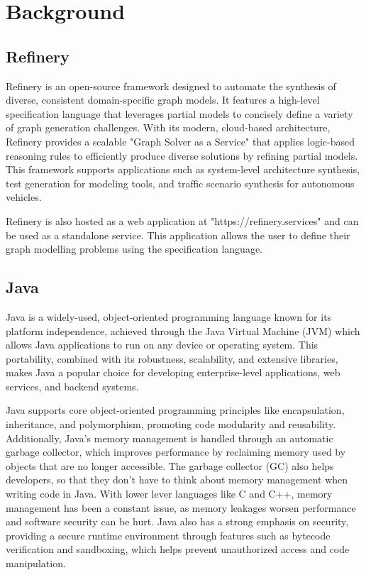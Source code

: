 \chapter{Background}
\section{Refinery}
	Refinery \cite{refinery} is an open-source framework designed to automate the synthesis of diverse, consistent domain-specific graph models. 
	It features a high-level specification language that leverages partial models to concisely define a variety of graph generation challenges. 
	With its modern, cloud-based architecture, Refinery provides a scalable "Graph Solver as a Service" that applies logic-based reasoning rules to 
	efficiently produce diverse solutions by refining partial models. This framework supports applications such as system-level architecture synthesis,
	test generation for modeling tools, and traffic scenario synthesis for autonomous vehicles.

	Refinery is also hosted as a web application at "https://refinery.services" and can be used as a standalone service.
	This application allows the user to define their graph modelling problems using the specification language. 

\section{Java}
	Java \cite{java} is a widely-used, object-oriented programming language known for its platform independence, achieved through the Java Virtual Machine (JVM) 
	which allows Java applications to run on any device or operating system. This portability, combined with its robustness, scalability, and extensive libraries,
	makes Java a popular choice for developing enterprise-level applications, web services, and backend systems.

	Java supports core object-oriented programming principles like encapsulation, inheritance, and polymorphism, promoting code modularity and reusability.
	Additionally, Java’s memory management is handled through an automatic garbage collector, which improves performance by reclaiming memory used by objects 
	that are no longer accessible. The garbage collector (GC) also helps developers, so that they don't have to think about memory management when writing code in Java.
	With lower lever languages like C and C++, memory management has been a constant issue, as memory leakages worsen performance and software security can be hurt.
	Java also has a strong emphasis on security, providing a secure runtime environment through features such as bytecode 
	verification and sandboxing, which helps prevent unauthorized access and code manipulation.

